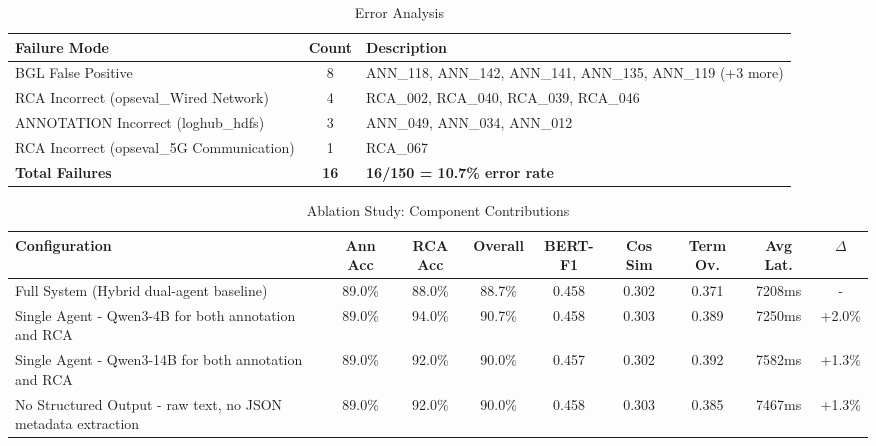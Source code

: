\begin{table}[h]
\centering
\caption{Error Analysis}
\label{tab:error-analysis}
\begin{tabular}{lcp{8cm}}
\toprule
\textbf{Failure Mode} & \textbf{Count} & \textbf{Description} \\
\midrule
BGL False Positive & 8 & ANN_118, ANN_142, ANN_141, ANN_135, ANN_119 (+3 more) \\
RCA Incorrect (opseval_Wired Network) & 4 & RCA_002, RCA_040, RCA_039, RCA_046 \\
ANNOTATION Incorrect (loghub_hdfs) & 3 & ANN_049, ANN_034, ANN_012 \\
RCA Incorrect (opseval_5G Communication) & 1 & RCA_067 \\
\midrule
\textbf{Total Failures} & \textbf{16} & \textbf{16/150 = 10.7\% error rate} \\
\bottomrule
\end{tabular}
\end{table}


\begin{table}[h]
\centering
\caption{Ablation Study: Component Contributions}
\label{tab:ablation}
\begin{tabular}{lcccccccc}
\toprule
\textbf{Configuration} & \textbf{Ann Acc} & \textbf{RCA Acc} & \textbf{Overall} & \textbf{BERT-F1} & \textbf{Cos Sim} & \textbf{Term Ov.} & \textbf{Avg Lat.} & \textbf{$\Delta$} \\
\midrule
Full System (Hybrid dual-agent baseline) & 89.0\% & 88.0\% & 88.7\% & 0.458 & 0.302 & 0.371 & 7208ms & - \\
Single Agent - Qwen3-4B for both annotation and RCA & 89.0\% & 94.0\% & 90.7\% & 0.458 & 0.303 & 0.389 & 7250ms & +2.0\% \\
Single Agent - Qwen3-14B for both annotation and RCA & 89.0\% & 92.0\% & 90.0\% & 0.457 & 0.302 & 0.392 & 7582ms & +1.3\% \\
No Structured Output - raw text, no JSON metadata extraction & 89.0\% & 92.0\% & 90.0\% & 0.458 & 0.303 & 0.385 & 7467ms & +1.3\% \\
\bottomrule
\end{tabular}
\end{table}

